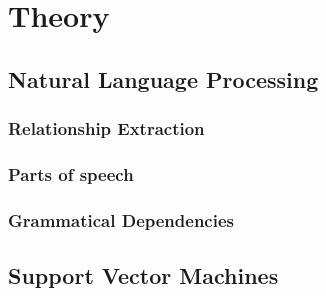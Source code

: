 \chapter{Theory}\label{chapter:theory}


\section{Natural Language Processing}

\subsection{Relationship Extraction}\label{sec:RE}

\subsection{Parts of speech}

\subsection{Grammatical Dependencies}

\section{Support Vector Machines}
